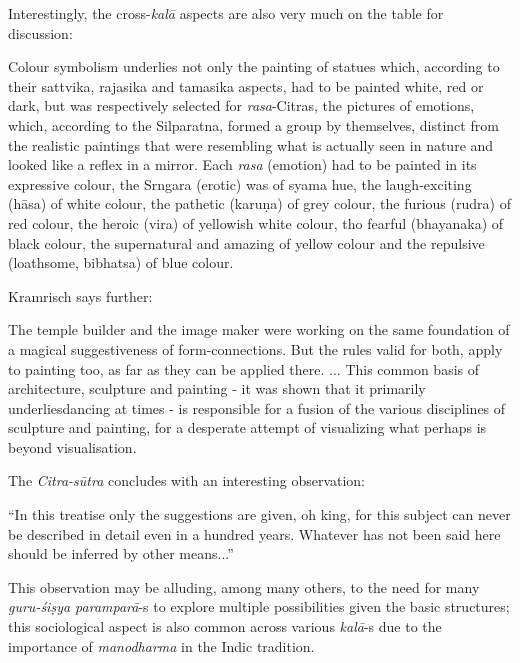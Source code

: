 Interestingly, the cross-\textsl{kalā} aspects are also very much on the table for discussion:

\begin{myquote}
Colour symbolism underlies not only the painting of statues which, according to their sattvika, rajasika and tamasika aspects, had to be painted white, red or dark, but was respectively selected for \textsl{rasa}-Citras, the pictures of emotions, which, according to the Silparatna, formed a group by themselves, distinct from the realistic paintings that were resembling what is actually seen in nature and looked like a reflex in a mirror. Each \textsl{rasa} (emotion) had to be painted in its expressive colour, the Srngara (erotic) was of syama hue, the laugh-exciting (hāsa) of white colour, the pathetic (karuṇa) of grey colour, the furious (rudra) of red colour, the heroic (vira) of yellowish white colour, tho fearful (bhayanaka) of black colour, the supernatural and amazing of yellow colour and the repulsive (loathsome, bibhatsa) of blue colour.
\end{myquote}

Kramrisch says further:

\begin{myquote}
The temple builder and the image maker were working on the same foundation of a magical suggestiveness of form-connections. But the rules valid for both, apply to painting too, as far as they can be applied there. ... This common basis of architecture, sculpture and painting - it was shown that it primarily underliesdancing at times - is responsible for a fusion of the various disciplines of sculpture and painting, for a desperate attempt of visualizing what perhaps is beyond visualisation.
\end{myquote}

The \textsl{Citra-sūtra} concludes with an interesting observation: 

\begin{myquote}
“In this treatise only the suggestions are given, oh king, for this subject can never be described in detail even in a hundred years. Whatever has not been said here should be inferred by other means...” 
\end{myquote}

This observation may be alluding, among many others, to the need for many \textsl{guru-śiṣya paramparā}-s to explore multiple possibilities given the basic structures; this sociological aspect is also common across various \textsl{kalā}-s due to the importance of \textsl{manodharma} in the Indic tradition. 

